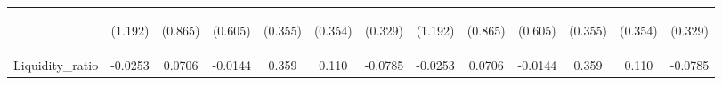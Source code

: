 \documentclass[]{article}
\begin{document}
\begin{center}
\begin{tabular}{lcccccccccccc}
\vspace{4pt} & \begin{footnotesize}(1.192)\end{footnotesize} & \begin{footnotesize}(0.865)\end{footnotesize} & \begin{footnotesize}(0.605)\end{footnotesize} & \begin{footnotesize}(0.355)\end{footnotesize} & \begin{footnotesize}(0.354)\end{footnotesize} & \begin{footnotesize}(0.329)\end{footnotesize} & \begin{footnotesize}(1.192)\end{footnotesize} & \begin{footnotesize}(0.865)\end{footnotesize} & \begin{footnotesize}(0.605)\end{footnotesize} & \begin{footnotesize}(0.355)\end{footnotesize} & \begin{footnotesize}(0.354)\end{footnotesize} & \begin{footnotesize}(0.329)\end{footnotesize} \\
Liquidity\_ratio & -0.0253 & 0.0706 & -0.0144 & 0.359 & 0.110 & -0.0785 & -0.0253 & 0.0706 & -0.0144 & 0.359 & 0.110 & -0.0785 \\

\end{tabular}
\end{center}
\end{document}
